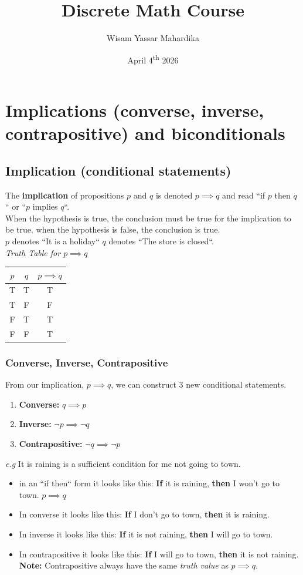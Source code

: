 \documentclass{article}
\title{Discrete Math Course}
\author{Wisam Yassar Mahardika}
\date{April 4\textsuperscript{th} 2026}
\begin{document}
\maketitle
\clearpage
\tableofcontents
\clearpage
\section{Implications (converse, inverse, contrapositive) and biconditionals}
\subsection{Implication (conditional statements)}
The \textbf{implication} of propositions $ p $ and $ q $ is denoted $ p \implies q $ and read ``if $ p $ then $ q $`` or ``$ p $ implies $ q $``.\\


When the hypothesis is true, the conclusion must be true for the implication to be true. when the hypothesis is false, the conclusion is true.\\


$ p $ denotes ``It is a holiday`` $ q $ denotes ``The store is closed``. \\


\textit{Truth Table for $ p \implies q $}
\begin{tabular}{|c|c|c|}
\hline
$ p $ & $ q $ & $ p \implies q $ \\
\hline
T & T & T \\ 
T & F & F \\
F & T & T \\
F & F & T \\
\hline 
\end{tabular}
\subsubsection{Converse, Inverse, Contrapositive}
From our implication, $ p \implies q $, we can construct 3 new conditional statements.
\begin{enumerate}
	\item \textbf{Converse: }$ q \implies p $ 
	\item \textbf{Inverse: }$ \neg p \implies \neg q $
	\item \textbf{Contrapositive: }$ \neg q \implies \neg p $
\end{enumerate}


\textit{e.g} It is raining is a sufficient condition for me not going to town.
\begin{itemize}
	\item in an ``if then`` form it looks like this: \textbf{If} it is raining, \textbf{then} I won't go to town. $ p \implies q $
	\item In converse it looks like this: \textbf{If} I don't go to town, \textbf{then} it is raining.
	\item In inverse it looks like this: \textbf{If} it is not raining, \textbf{then} I will go to town.
	\item In contrapositive it looks like this: \textbf{If} I will go to town, \textbf{then} it is not raining.\\
\textbf{Note: }Contrapositive always have the same \textit{truth value} as $ p \implies q $.
\end{itemize}
\end{document}

